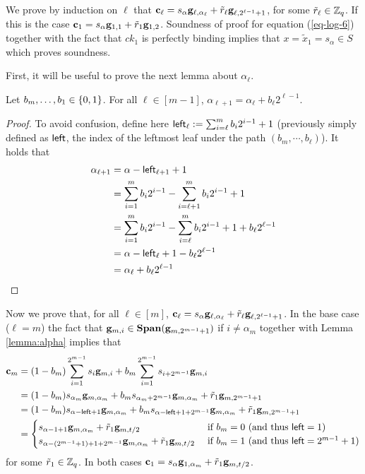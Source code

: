 We prove by induction on \(\ell\) that \(\mathbf{c}_\ell= s_\alpha\mathbf{g}_{\ell,\alpha_\ell}+\tilde{r}_{\ell}\mathbf{g}_{\ell,2^{\ell-1}+1}\), for some $\tilde{r}_\ell\in\mathbb{Z}_q$. If this is the case $\mathbf{c}_1=s_\alpha\mathbf{g}_{1,1}+\tilde{r}_{1}\mathbf{g}_{1,2}$. Soundness of proof for equation (\ref{eq-log-6}) together with the fact that \(ck_1\) is perfectly binding implies that \(x=\tilde{x}_{1}=s_{\alpha}\in S\) which proves soundness.

First, it will be useful to prove the next lemma about $\alpha_\ell$.
\begin{lemma} Let $b_m,\ldots,b_1\in\{0,1\}$. For all $\ell\in[m-1]$, $\alpha_{\ell+1}=\alpha_{\ell}+b_\ell2^{\ell-1}$.
\label{lemma:alpha}
\end{lemma}
\begin{proof}
To avoid confusion, define here ${\mathsf{left}}_\ell:=\sum_{i=\ell}^m b_i2^{i-1}+1$ (previously simply defined as ${\mathsf{left}}$, the index of the leftmost leaf under the path $(b_m,\cdots, b_\ell)$). It holds that
\begin{align*}
\alpha_{\ell+1} &= \alpha - {\mathsf{left}}_{\ell+1} + 1\\
&= \sum_{i=1}^{m} b_i2^{i-1} - \sum_{i=\ell+1}^{m}b_i2^{i-1} +1\\
&= \sum_{i=1}^{m} b_i2^{i-1} - \sum_{i=\ell}^{m}b_i2^{i-1} +1 +b_\ell2^{\ell-1}\\
&= \alpha - {\mathsf{left}}_\ell +1 -b_\ell2^{\ell-1}\\
&=\alpha_\ell+b_\ell2^{\ell-1}
\end{align*}
\end{proof}

Now we prove that, for all $\ell\in[m]$, \(\mathbf{c}_\ell= s_\alpha\mathbf{g}_{\ell,\alpha_\ell}+\tilde{r}_{\ell}\mathbf{g}_{\ell,2^{\ell-1}+1}\).
In the base case ($\ell=m$) the fact that \(\mathbf{g}_{m,i}\in\mathbf{Span}(\mathbf{g}_{m,2^{m-1}+1})\) if \(i\neq \alpha_m\) together with Lemma \ref{lemma:alpha} implies that 
\begin{align*}
\mathbf{c}_m &= (1-b_m)\sum_{i=1}^{2^{m-1}}s_i \mathbf{g}_{m,i}+b_m\sum_{i=1}^{2^{m-1}}s_{i+2^{m-1}}\mathbf{g}_{m,i}\\
&= (1-b_m)s_{\alpha_m}\mathbf{g}_{m,\alpha_m} +b_ms_{\alpha_m+2^{m-1}}\mathbf{g}_{m,\alpha_m}+\tilde{r}_1\mathbf{g}_{m,2^{m-1}+1}\\
&= (1-b_m)s_{\alpha-{\mathsf{left}}+1}\mathbf{g}_{m,\alpha_m} +b_ms_{\alpha-{\mathsf{left}}+1+2^{m-1}}\mathbf{g}_{m,\alpha_m}+\tilde{r}_1\mathbf{g}_{m,2^{m-1}+1}\\
&=\begin{cases}
    s_{\alpha-1+1}\mathbf{g}_{m,\alpha_m}+\tilde{r}_1\mathbf{g}_{m,t/2} & \text{ if } b_m=0 \ (\text{and thus }{\mathsf{left}}=1) \\
    s_{\alpha-(2^{m-1}+1)+1+2^{m-1}}\mathbf{g}_{m,\alpha_m}+\tilde{r}_1\mathbf{g}_{m,t/2} & \text{ if } b_m=1 \ (\text{and thus }{\mathsf{left}}=2^{m-1}+1) 
\end{cases}
\end{align*}
for some \(\tilde{r}_1\in\mathbb{Z}_q\). In both cases $\mathbf{c}_1=s_\alpha\mathbf{g}_{1,\alpha_m}+\tilde{r}_1\mathbf{g}_{m,t/2}$.


